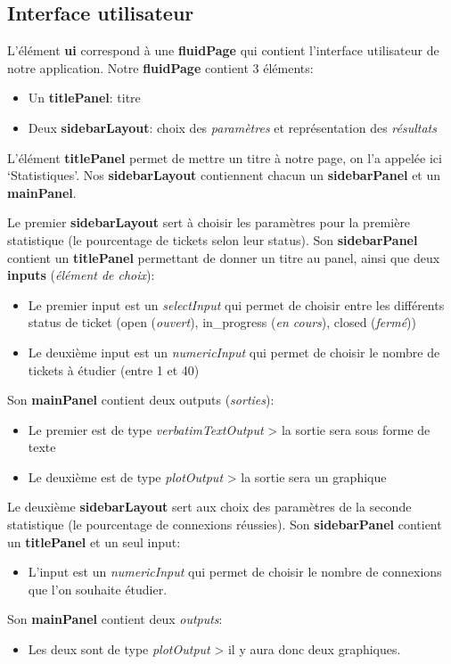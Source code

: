 \documentclass[12pt, a4paper]{article}
\begin{document}
\subsection*{Interface utilisateur}

L'élément \textbf{ui} correspond à une \textbf{fluidPage} qui contient l'interface utilisateur de notre application.
Notre \textbf{fluidPage} contient 3 éléments:
\begin{itemize}
    \item Un \textbf{titlePanel}: titre
    \item Deux \textbf{sidebarLayout}: choix des \textit{paramètres} et représentation des \textit{résultats}
\end{itemize}
L'élément \textbf{titlePanel} permet de mettre un titre à notre page, on l'a appelée ici `Statistiques'.
Nos \textbf{sidebarLayout} contiennent chacun un \textbf{sidebarPanel} et un \textbf{mainPanel}.
\bigskip

Le premier \textbf{sidebarLayout} sert à choisir les paramètres pour la première statistique (le pourcentage de tickets selon leur status).
Son \textbf{sidebarPanel} contient un \textbf{titlePanel} permettant de donner un titre au panel, ainsi que deux \textbf{inputs} (\textit{élément de choix}):
\begin{itemize}
    \item Le premier input est un \textit{selectInput} qui permet de choisir entre les différents status de ticket
    (open (\textit{ouvert}), in\_progress (\textit{en cours}), closed (\textit{fermé}))
    \item Le deuxième input est un \textit{numericInput} qui permet de choisir le nombre de tickets à étudier (entre 1 et 40)
\end{itemize}
Son \textbf{mainPanel} contient deux outputs (\textit{sorties}):
\begin{itemize}
    \item Le premier est de type \textit{verbatimTextOutput} > la sortie sera sous forme de texte
    \item Le deuxième est de type \textit{plotOutput} > la sortie sera un graphique
\end{itemize}
\bigskip

Le deuxième \textbf{sidebarLayout} sert aux choix des paramètres de la seconde statistique (le pourcentage de connexions réussies).
Son \textbf{sidebarPanel} contient un \textbf{titlePanel} et un seul input:
\begin{itemize}
    \item L'input est un \textit{numericInput}  qui permet de choisir le nombre de connexions que l'on souhaite étudier.
\end{itemize}
Son \textbf{mainPanel} contient deux \textit{outputs}:
\begin{itemize}
    \item Les deux sont de type \textit{plotOutput} > il y aura donc deux graphiques.
\end{itemize}
\end{document}
